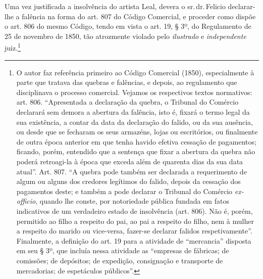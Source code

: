 Uma vez justificada a insolvência do artista Leal, devera o sr.\,dr.\,Felicio declarar-lhe a falência na forma do art. 807 do Código
Comercial, e proceder como dispõe o art. 806 do mesmo Código, tendo em
vista o art. 19, § 3º, do Regulamento de 25 de novembro de 1850, tão
atrozmente violado pelo \emph{ilustrado} e \emph{independente}
juiz.\footnote{ O autor faz referência primeiro ao Código Comercial
  (1850), especialmente à parte que tratava das quebras e falências, e
  depois, ao regulamento que disciplinava o processo comercial. Vejamos
  os respectivos textos normativos: art. 806. ``Apresentada a declaração
  da quebra, o Tribunal do Comércio declarará sem demora a abertura da
  falência, isto é, fixará o termo legal da sua existência, a contar da
  data da declaração do falido, ou da sua ausência, ou desde que se
  fecharam os seus armazéns, lojas ou escritórios, ou finalmente de
  outra época anterior em que tenha havido efetiva cessação de
  pagamentos; ficando, porém, entendido que a sentença que fixar a
  abertura da quebra não poderá retroagi-la à época que exceda além de
  quarenta dias da sua data atual''. Art. 807. ``A quebra pode também ser
  declarada a requerimento de algum ou alguns dos credores legítimos do
  falido, depois da cessação dos pagamentos deste; e também a pode
  declarar o Tribunal do Comércio \emph{ex-officio}, quando lhe conste,
  por notoriedade pública fundada em fatos indicativos de um verdadeiro
  estado de insolvência (art. 806). Não é, porém, permitido ao filho a
  respeito do pai, ao pai a respeito do filho, nem à mulher a respeito
  do marido ou vice-versa, fazer-se declarar falidos respetivamente''.
  Finalmente, a definição do art. 19 para a atividade de ``mercancia''
  disposta em seu § 3º, que incluía nessa atividade as ``empresas de
  fábricas; de comissões; de depósitos; de expedição, consignação e
  transporte de mercadorias; de espetáculos públicos''.}

